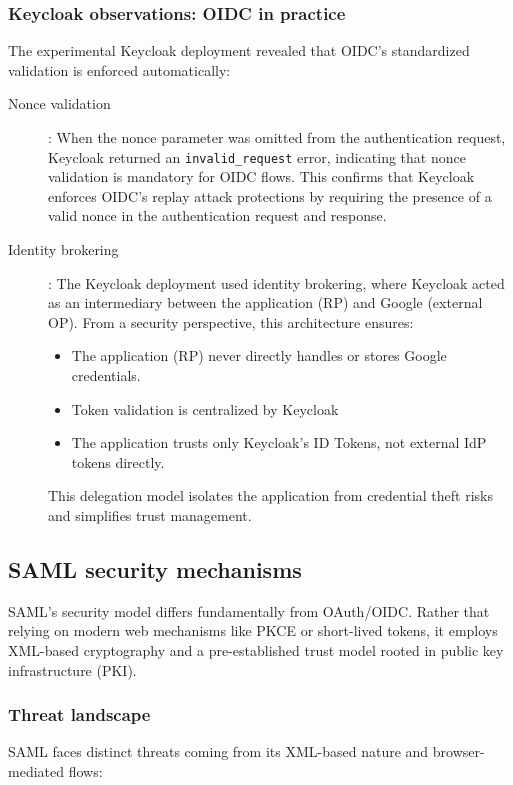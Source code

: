\documentclass[../memoire.tex]{subfiles}
\begin{document}
\subsubsection*{Keycloak observations: OIDC in practice}

The experimental Keycloak deployment revealed that OIDC's standardized validation is enforced automatically:

\begin{description}
  \item[Nonce validation]: When the nonce parameter was omitted from the authentication request, Keycloak returned an \texttt{invalid\_request} error, indicating that nonce validation is mandatory for OIDC flows. This confirms that Keycloak enforces OIDC's replay attack protections by requiring the presence of a valid nonce in the authentication request and response.
  \item[Identity brokering]: The Keycloak deployment used identity brokering, where Keycloak acted as an intermediary between the application (RP) and Google (external OP). From a security perspective, this architecture ensures:
    \begin{itemize}
      \item The application (RP) never directly handles or stores Google credentials.
      \item Token validation is centralized by Keycloak
      \item The application trusts only Keycloak's ID Tokens, not external IdP tokens directly.
    \end{itemize} 
  This delegation model isolates the application from credential theft risks and simplifies trust management.
\end{description}

\subsection{SAML security mechanisms}

SAML's security model differs fundamentally from OAuth/OIDC. Rather that relying on modern web mechanisms like PKCE or short-lived tokens, it employs XML-based cryptography and a pre-established trust model rooted in public key infrastructure (PKI).

\subsubsection*{Threat landscape}

SAML faces distinct threats coming from its XML-based nature and browser-mediated flows:
\end{document}
